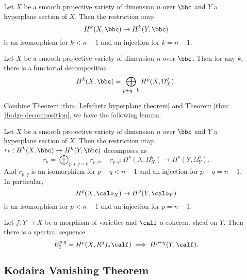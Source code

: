     \begin{theorem}\label{thm: Lefschetz hyperplane theorem}
        Let \(X\) be a smooth projective variety of dimension \(n\) over \(\bbc\) and \(Y\) a hyperplane section of \(X\).
        Then the restriction map
        \[
            H^k(X,\bbc) \to H^k(Y, \bbc)
        \]
        is an isomorphism for \(k < n - 1\) and an injection for \(k = n - 1\).
    \end{theorem}

    \begin{theorem}\label{thm: Hodge decomposition}
        Let \(X\) be a smooth projective variety of dimension \(n\) over \(\bbc\).
        Then for any \(k\), there is a functorial decomposition
        \[
            H^k(X, \bbc) = \bigoplus_{p+q=k} H^{p}(X, \Omega^q_X).
        \]
    \end{theorem}

    Combine Theorem \ref{thm: Lefschetz hyperplane theorem} and Theorem \ref{thm: Hodge decomposition}, we have the following lemma.

    \begin{lemma}\label{lem: Lefschetz hyperplane theorem for cohomology of structure sheaf}
        Let \(X\) be a smooth projective variety of dimension \(n\) over \(\bbc\) and \(Y\) a hyperplane section of \(X\).
        Then the restriction map \(r_k: H^k(X,\bbc) \to H^k(Y, \bbc)\) decomposes as 
        \[
            r_k = \bigoplus_{p+q=k} r_{p,q},\quad r_{p,q}: H^{p}(X, \Omega^q_X) \to H^{p}(Y, \Omega^q_Y).
        \]
        And \(r_{p,q}\) is an isomorphism for \(p + q < n - 1\) and an injection for \(p + q = n - 1\).
        In particular, 
        \[ H^p(X, \calo_X) \to H^p(Y, \calo_Y) \]
        is an isomorphism for \(p < n - 1\) and an injection for \(p = n - 1\).
    \end{lemma}

    \begin{theorem}\label{thm: Leray spectral sequence}
        Let \(f: Y \to X\) be a morphism of varieties and \(\calf\) a coherent sheaf on \(Y\).
        Then there is a spectral sequence
        \[
            E_2^{p,q} = H^p(X, R^q f_* \calf) \implies H^{p+q}(Y, \calf).
        \]
    \end{theorem}
        

\subsection{Kodaira Vanishing Theorem}

